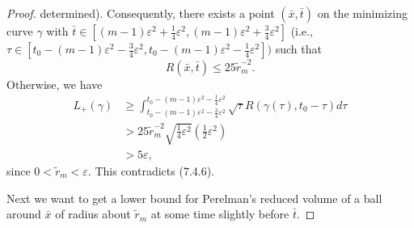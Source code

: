 \begin{proof}
determined). Consequently, there exists a point
$(\bar{x},\bar{t})$ on the minimizing curve $\gamma$ with
$\bar{t}\in[(m-1)\varepsilon^2+\frac{1}{4}\varepsilon^2,
(m-1)\varepsilon^2+\frac{3}{4}\varepsilon^2]$ (i.e.,
$\tau\in[t_0-(m-1)\varepsilon^2-\frac{3}{4}\varepsilon^2,
t_0-(m-1)\varepsilon^2-\frac{1}{4}\varepsilon^2])$ such that \begin{equation}
R(\bar{x},\bar{t})\leq25\widetilde{r}^{-2}_m. %
\end{equation} Otherwise, we have
\begin{align*}
L_+(\gamma)& \geq
\int^{t_0-(m-1)\varepsilon^2-\frac{1}{4}\varepsilon^2}_{t_0-(m-1)
\varepsilon^2-\frac{3}{4}\varepsilon^2}
\sqrt{\tau}R(\gamma(\tau),t_0-\tau)d\tau\\
&  > 25\widetilde{r}^{-2}_m\sqrt{\frac{1}{4}\varepsilon^2}
\left(\frac{1}{2}\varepsilon^2\right)\\
&  > 5\varepsilon,
\end{align*}
since $0<\widetilde{r}_m<\varepsilon$. This contradicts (7.4.6).

Next we want to get a lower bound for Perelman's reduced volume of
a ball around $\bar{x}$ of radius about $\widetilde{r}_m$ at some
time slightly before $\bar{t}$.


\end{proof}
